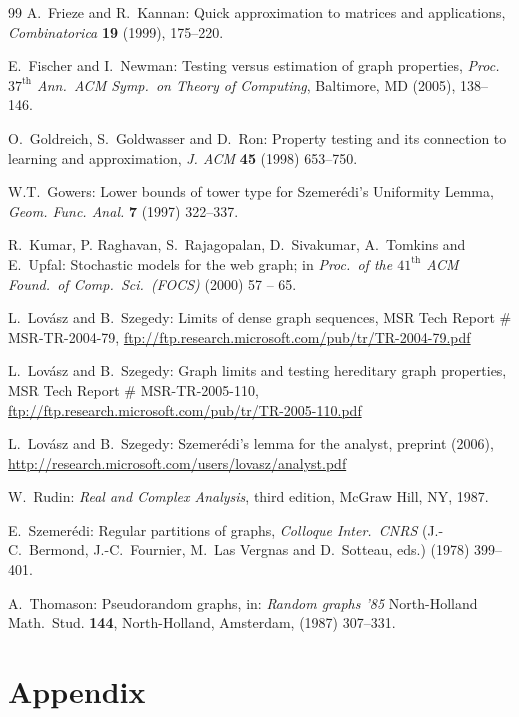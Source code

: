 \documentclass[12pt]{article}
\numberwithin{equation}{section}
\begin{document}
\begin{thebibliography}{99}
A.~Frieze and R.~Kannan: Quick approximation to matrices and
applications, {\it Combinatorica} {\bf 19} (1999), 175--220.

E.~Fischer and I.~Newman: Testing versus estimation of graph
properties, {\it Proc.\ $\text{37}^\text{th}$ Ann.\ ACM Symp.\ on
Theory of Computing}, Baltimore, MD (2005), 138--146.

O.~Goldreich, S.~Goldwasser and D.~Ron: Property testing and its
connection to learning and approximation, {\it J. ACM} {\bf 45}
(1998) 653--750.

W.T.~Gowers: Lower bounds of tower type for Szemer\'edi's Uniformity
Lemma, {\it Geom. Func. Anal.} {\bf 7} (1997) 322--337.

 R.~Kumar, P. Raghavan, S.~Rajagopalan, D.~Sivakumar,
A.~Tomkins
and E.~Upfal: Stochastic models for the web graph;
in
{\it Proc.\ of the $\text{41}^\text{th}$ ACM Found.\ of Comp.\ Sci.\
(FOCS)} (2000) 57 -- 65.

L.~Lov\'asz and B.~Szegedy: Limits of dense graph sequences, MSR Tech
Report \# MSR-TR-2004-79, \url{
ftp://ftp.research.microsoft.com/pub/tr/TR-2004-79.pdf}

L.~Lov\'asz and B.~Szegedy: Graph limits and testing hereditary graph
properties, MSR Tech Report \# MSR-TR-2005-110, \\
\url{ftp://ftp.research.microsoft.com/pub/tr/TR-2005-110.pdf}

L.~Lov\'asz and B.~Szegedy: Szemer\'edi's lemma for the analyst,
preprint (2006),
\\ \url{
http://research.microsoft.com/users/lovasz/analyst.pdf}


W.~Rudin: {\it Real and Complex Analysis}, third edition, McGraw
Hill, NY, 1987.

E.~Szemer\'edi: Regular partitions of graphs, {\it Colloque Inter.\
CNRS} (J.-C.~Bermond, J.-C.~Fournier, M.~Las Vergnas and D.~Sotteau,
eds.) (1978) 399--401.

A.~Thomason: Pseudorandom graphs, in: {\it Random graphs '85}
North-Holland Math.~Stud. {\bf 144}, North-Holland, Amsterdam, (1987)
307--331.

\end{thebibliography}



\newpage
\section{Appendix}
\label{sec:appendix}
\end{document}
